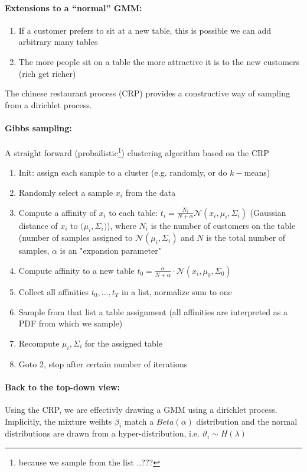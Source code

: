 \paragraph{Extensions to a ``normal'' GMM:}
\begin{enumerate}
	\item If a customer prefers to sit at a new table, this is possible we can add arbitrary many tables
	\item The more people sit on a table  the more attractive it is to the new customers (rich get richer)
\end{enumerate}

The chinese restaurant process (CRP) provides a constructive way of sampling from a dirichlet process.

\paragraph{Gibbs sampling:}
A straight forward (probailistic\footnote{because we sample from the list ..???}) clustering algorithm based on the CRP

\begin{enumerate}
    \item Init: assign each sample to a cluster (e.g. randomly, or do \(k-\)means)
    \item Randomly select a sample \(x_i\) from the data
    \item Compute a affinity of \(x_i\) to each table: \(t_i = \frac{N_i}{N+\alpha} \mathcal{N}(x_i, \mu_i, \Sigma_i)\) (Gaussian distance of \(x_i\) to \(\mathcal(\mu_i, \Sigma_i)\)), where \(N_i\) is the number of customers on the table (number of samples assigned to \(\mathcal{N}(\mu_i, \Sigma_i)\) and \(N\) is the total number of samples, \(\alpha\) is an "expansion parameter"
    \item Compute affinity to a new table \(t_0 = \frac{\alpha}{N + \alpha} \cdot \mathcal{N}(x_i, \mu_0, \Sigma_0)\)
    \item Collect all affinities \(t_0, \dots, t_T\) in a list, normalize sum to one
    \item Sample from that list a table assignment (all affinities are interpreted as a PDF from which we sample)
    \item Recompute \(\mu_i, \Sigma_i\) for the assigned table
    \item Goto 2, stop after certain number of iterations
\end{enumerate}

\paragraph{Back to the top-down view:}
Using the CRP, we are effectivly drawing a GMM using a dirichlet process. Implicitly, the mixture weihts $\beta_i$ match a $Beta(\alpha)$ distribution and the normal distributions are drawn from a hyper-distribution, i.e. $\vartheta_i \sim H(\lambda)$

